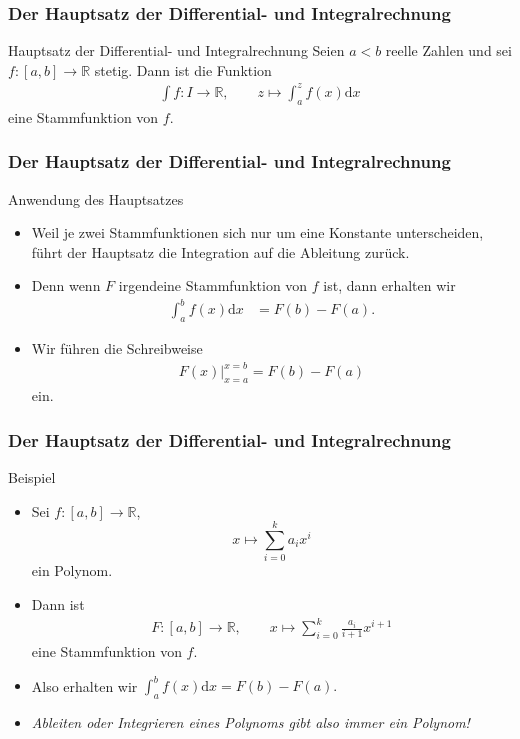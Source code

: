 \documentclass{beamer}
\newcommand\dd{\mathrm d}
\newcommand\RR{\mathbb R}
\newcommand{\ue}{\"u}
\newcommand{\mytitle}{Der Hauptsatz der Differential- und Integralrechnung}
\begin{document}
\begin{frame}\frametitle{\mytitle}
	\begin{block}{Hauptsatz der Differential- und Integralrechnung}
		Seien $a<b$ reelle Zahlen und sei $f:[ a,b ]\to\RR$ stetig.
		Dann ist die Funktion
		\begin{align*}
			\int f:I\to\RR,\qquad z\mapsto\int_a^zf(x)\dd x
		\end{align*}
		eine Stammfunktion von $f$.
	\end{block}
\end{frame}

\begin{frame}\frametitle{\mytitle}
	\begin{block}{Anwendung des Hauptsatzes}
	\begin{itemize}
	\item Weil je zwei Stammfunktionen sich nur um eine Konstante unterscheiden, f\ue hrt der Hauptsatz die Integration auf die Ableitung zur\ue ck.
	\item Denn wenn $F$ \alert{irgendeine} Stammfunktion von $f$ ist, dann erhalten wir
		\begin{align*}
			\int_a^bf(x)\dd x&=F(b)-F(a).
		\end{align*}
	\item Wir f\ue hren die Schreibweise
		\begin{align*}
			F(x)\bigg|_{x=a}^{x=b}=F(b)-F(a)
		\end{align*}
		ein.
	\end{itemize}
	\end{block}
\end{frame}

\begin{frame}\frametitle{\mytitle}
	\begin{block}{Beispiel}
	\begin{itemize}
		\item Sei $f:[a,b]\to\RR$, $$x\mapsto\sum_{i=0}^ka_ix^i$$ ein Polynom.
		\item Dann ist
			\begin{align*}
				F:[a,b]\to\RR,\qquad x\mapsto\sum_{i=0}^k\frac{a_i}{i+1}x^{i+1}
			\end{align*}
			eine Stammfunktion von $f$.
		\item Also erhalten wir $ \int_a^bf(x)\dd x=F(b)-F(a).  $
		\item {\itshape Ableiten oder Integrieren eines Polynoms gibt also immer ein Polynom!}
	\end{itemize}
	\end{block}
\end{frame}
\end{document}
